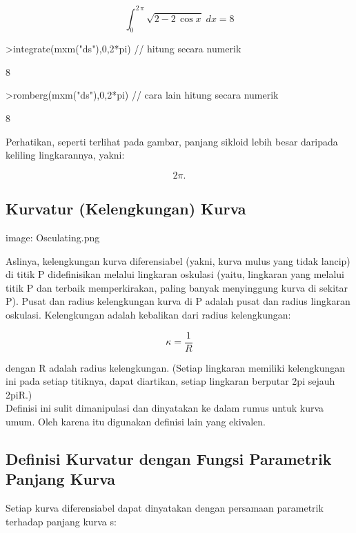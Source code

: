 \documentclass{article}
\newenvironment{eulernotebook}{\par}{\par}
\newcommand{\eulersubheading}[1]{\subsection{#1}}
\newenvironment{eulercomment}{\par\medskip}{\par\medskip}
\newenvironment{eulerformula}{}{}
\begin{document}
\begin{eulernotebook}
\begin{eulercomment}
\begin{eulercomment}
\begin{eulercomment}
\begin{eulercomment}
\begin{eulerformula}
\[
\int_{0}^{2\,\pi}{\sqrt{2-2\,\cos x}\;dx}=8
\]
\end{eulerformula}
\begin{eulerprompt}
>integrate(mxm("ds"),0,2*pi) // hitung secara numerik
\end{eulerprompt}
\begin{euleroutput}
  8
\end{euleroutput}
\begin{eulerprompt}
>romberg(mxm("ds"),0,2*pi) // cara lain hitung secara numerik
\end{eulerprompt}
\begin{euleroutput}
  8
\end{euleroutput}
\begin{eulercomment}
Perhatikan, seperti terlihat pada gambar, panjang sikloid lebih besar daripada keliling lingkarannya, yakni:

\end{eulercomment}
\begin{eulerformula}
\[
2\pi.
\]
\end{eulerformula}
\eulersubheading{Kurvatur (Kelengkungan) Kurva}
\begin{eulercomment}
image: Osculating.png

Aslinya, kelengkungan kurva diferensiabel (yakni, kurva mulus yang tidak lancip) di titik P didefinisikan melalui lingkaran
oskulasi (yaitu, lingkaran yang melalui titik P dan terbaik memperkirakan, paling banyak menyinggung kurva di sekitar P). Pusat
dan radius kelengkungan kurva di P adalah pusat dan radius lingkaran oskulasi. Kelengkungan adalah kebalikan dari radius
kelengkungan:

\end{eulercomment}
\begin{eulerformula}
\[
\kappa =\frac {1}{R}
\]
\end{eulerformula}
\begin{eulercomment}
dengan R adalah radius kelengkungan. (Setiap lingkaran memiliki kelengkungan ini pada setiap titiknya, dapat diartikan, setiap
lingkaran berputar 2pi sejauh 2piR.)\\
Definisi ini sulit dimanipulasi dan dinyatakan ke dalam rumus untuk kurva umum. Oleh karena itu digunakan definisi lain yang
ekivalen.

\end{eulercomment}
\eulersubheading{Definisi Kurvatur dengan Fungsi Parametrik Panjang Kurva}
\begin{eulercomment}
Setiap kurva diferensiabel dapat dinyatakan dengan persamaan parametrik terhadap panjang kurva s:


\end{eulercomment}
\end{eulercomment}
\end{eulercomment}
\end{eulercomment}
\end{eulercomment}
\end{eulernotebook}
\end{document}
